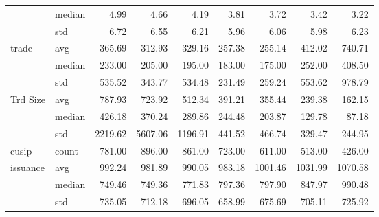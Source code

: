\begin{tabular}{llrrrrrrr}
 & median & 4.99 & 4.66 & 4.19 & 3.81 & 3.72 & 3.42 & 3.22 \\
 & std & 6.72 & 6.55 & 6.21 & 5.96 & 6.06 & 5.98 & 6.23 \\
\cline{1-9}
\multirow[t]{3}{*}{trade} & avg & 365.69 & 312.93 & 329.16 & 257.38 & 255.14 & 412.02 & 740.71 \\
 & median & 233.00 & 205.00 & 195.00 & 183.00 & 175.00 & 252.00 & 408.50 \\
 & std & 535.52 & 343.77 & 534.48 & 231.49 & 259.24 & 553.62 & 978.79 \\
\cline{1-9}
\multirow[t]{3}{*}{Trd Size} & avg & 787.93 & 723.92 & 512.34 & 391.21 & 355.44 & 239.38 & 162.15 \\
 & median & 426.18 & 370.24 & 289.86 & 244.48 & 203.87 & 129.78 & 87.18 \\
 & std & 2219.62 & 5607.06 & 1196.91 & 441.52 & 466.74 & 329.47 & 244.95 \\
\cline{1-9}
cusip & count & 781.00 & 896.00 & 861.00 & 723.00 & 611.00 & 513.00 & 426.00 \\
\cline{1-9}
\multirow[t]{3}{*}{issuance} & avg & 992.24 & 981.89 & 990.05 & 983.18 & 1001.46 & 1031.99 & 1070.58 \\
 & median & 749.46 & 749.36 & 771.83 & 797.36 & 797.90 & 847.97 & 990.48 \\
 & std & 735.05 & 712.18 & 696.05 & 658.99 & 675.69 & 705.11 & 725.92 \\
\cline{1-9}
\bottomrule
\end{tabular}
